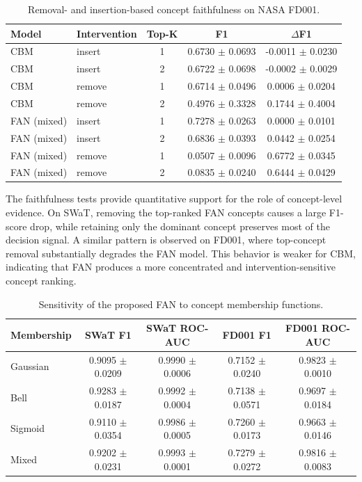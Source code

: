 \documentclass[runningheads]{llncs}
\begin{document}
\begin{table}[tbp]
\caption{Removal- and insertion-based concept faithfulness on NASA FD001.}
\label{tab:faithfulness_fd001}
\centering
\begin{tabular}{llccc}
\toprule
Model & Intervention & Top-K & F1 & $\Delta$F1 \\
\midrule
CBM & insert & 1 & 0.6730 $\pm$ 0.0693 & -0.0011 $\pm$ 0.0230 \\
CBM & insert & 2 & 0.6722 $\pm$ 0.0698 & -0.0002 $\pm$ 0.0029 \\
CBM & remove & 1 & 0.6714 $\pm$ 0.0496 & 0.0006 $\pm$ 0.0204 \\
CBM & remove & 2 & 0.4976 $\pm$ 0.3328 & 0.1744 $\pm$ 0.4004 \\
FAN (mixed) & insert & 1 & 0.7278 $\pm$ 0.0263 & 0.0000 $\pm$ 0.0101 \\
FAN (mixed) & insert & 2 & 0.6836 $\pm$ 0.0393 & 0.0442 $\pm$ 0.0254 \\
FAN (mixed) & remove & 1 & 0.0507 $\pm$ 0.0096 & 0.6772 $\pm$ 0.0345 \\
FAN (mixed) & remove & 2 & 0.0835 $\pm$ 0.0240 & 0.6444 $\pm$ 0.0429 \\
\bottomrule
\end{tabular}
\end{table}

The faithfulness tests provide quantitative support for the role of concept-level evidence. On SWaT, removing the top-ranked FAN concepts causes a large F1-score drop, while retaining only the dominant concept preserves most of the decision signal. A similar pattern is observed on FD001, where top-concept removal substantially degrades the FAN model. This behavior is weaker for CBM, indicating that FAN produces a more concentrated and intervention-sensitive concept ranking.

\begin{table}[tbp]
\caption{Sensitivity of the proposed FAN to concept membership functions.}
\label{tab:membership_sensitivity}
\centering
\begin{tabular}{lcccc}
\toprule
Membership & SWaT F1 & SWaT ROC-AUC & FD001 F1 & FD001 ROC-AUC \\
\midrule
Gaussian & 0.9095 $\pm$ 0.0209 & 0.9990 $\pm$ 0.0006 & 0.7152 $\pm$ 0.0240 & 0.9823 $\pm$ 0.0010 \\
Bell & 0.9283 $\pm$ 0.0187 & 0.9992 $\pm$ 0.0004 & 0.7138 $\pm$ 0.0571 & 0.9697 $\pm$ 0.0184 \\
Sigmoid & 0.9110 $\pm$ 0.0354 & 0.9986 $\pm$ 0.0005 & 0.7260 $\pm$ 0.0173 & 0.9663 $\pm$ 0.0146 \\
Mixed & 0.9202 $\pm$ 0.0231 & 0.9993 $\pm$ 0.0001 & 0.7279 $\pm$ 0.0272 & 0.9816 $\pm$ 0.0083 \\
\bottomrule
\end{tabular}
\end{table}
\end{document}
